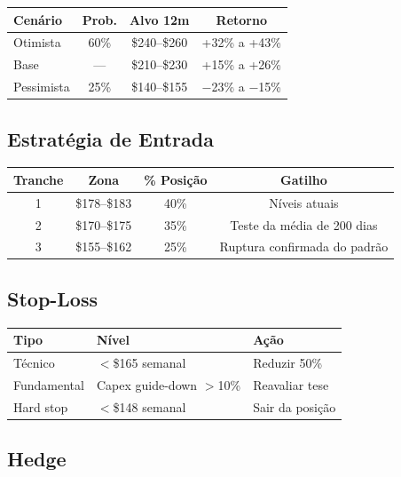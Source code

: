 \documentclass[11pt,a4paper]{article}
\begin{document}
\begin{table}[h]
\centering
\begin{tabular}{lccc}
\toprule
\textbf{Cen\'ario} & \textbf{Prob.} & \textbf{Alvo 12m} & \textbf{Retorno} \\
\midrule
Otimista & 60\% & \$240--\$260 & +32\% a +43\% \\
Base & --- & \$210--\$230 & +15\% a +26\% \\
Pessimista & 25\% & \$140--\$155 & $-$23\% a $-$15\% \\
\bottomrule
\end{tabular}
\end{table}

\subsection{Estrat\'egia de Entrada}

\begin{table}[h]
\centering
\begin{tabular}{cccc}
\toprule
\textbf{Tranche} & \textbf{Zona} & \textbf{\% Posi\c{c}\~ao} & \textbf{Gatilho} \\
\midrule
1 & \$178--\$183 & 40\% & N\'iveis atuais \\
2 & \$170--\$175 & 35\% & Teste da m\'edia de 200 dias \\
3 & \$155--\$162 & 25\% & Ruptura confirmada do padr\~ao \\
\bottomrule
\end{tabular}
\end{table}

\subsection{Stop-Loss}

\begin{table}[h]
\centering
\begin{tabularx}{\textwidth}{llX}
\toprule
\textbf{Tipo} & \textbf{N\'ivel} & \textbf{A\c{c}\~ao} \\
\midrule
T\'ecnico & $<$\$165 semanal & Reduzir 50\% \\
Fundamental & Capex guide-down $>$10\% & Reavaliar tese \\
Hard stop & $<$\$148 semanal & Sair da posi\c{c}\~ao \\
\bottomrule
\end{tabularx}
\end{table}

\subsection{Hedge}
\end{document}

